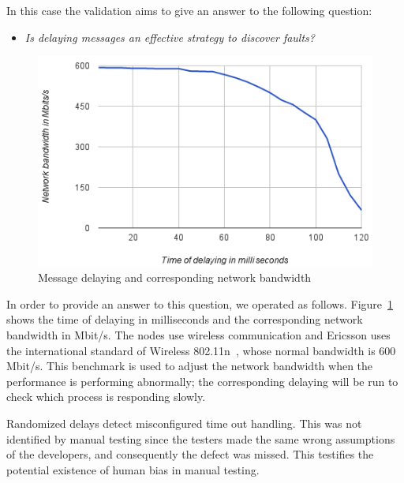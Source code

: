 In this case the validation aims to give an answer to the following question: 

 \begin{itemize}
 \item {\em Is delaying messages an effective strategy to discover faults?} 
 \end{itemize}

\begin{figure}[hh!]
\centering
\includegraphics[width=\columnwidth]{figure/bendelay.png}
\caption{Message delaying and corresponding network bandwidth \label{bendelay}}
\end{figure}

In order to provide an answer to this question, we operated as follows. 
Figure~\ref{bendelay} shows the time of delaying in milliseconds and the corresponding network bandwidth in Mbit/s. The nodes use wireless communication and Ericsson uses the international standard of Wireless 802.11n~\cite{Wireless}, whose normal bandwidth is 600 Mbit/s. This benchmark is used to adjust the %
network bandwidth when the performance is performing abnormally; the corresponding delaying will be run to check which process is responding slowly.

Randomized delays detect misconfigured time out handling. This was not identified by manual testing since the testers made the same wrong assumptions of the developers, %
and consequently the defect was missed. This testifies the potential existence of human bias in manual testing.


